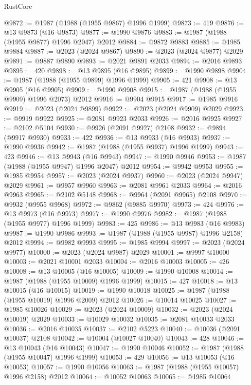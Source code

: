 \begin{lexlean}{RustCore}
\begin{coremodule}
@9872 := @1987 (@1988 (@1955 @9867) @1996 @1999)
@9873 := 419
@9876 := @13 @9873 (@16 @9873)
@9877 := @1990 @9876
@9883 := @1987 (@1988 (@1955 @9877) @1996 @2047) @2012
@9884 := @9872 @9883
@9885 := @1985 @9884
@9887 := @2023 (@2024 @9867)
@9890 := @2023 (@2024 @9877) @2029
@9891 := @9887 @9890
@9893 := @2021 @9891 @2033
@9894 := @2016 @9893
@9895 := 420
@9898 := @13 @9895 (@16 @9895)
@9899 := @1990 @9898
@9904 := @1987 (@1988 (@1955 @9899) @1996 @1999)
@9905 := 421
@9908 := @13 @9905 (@16 @9905)
@9909 := @1990 @9908
@9915 := @1987 (@1988 (@1955 @9909) @1996 @2073) @2012
@9916 := @9904 @9915
@9917 := @1985 @9916
@9919 := @2023 (@2024 @9899)
@9922 := @2023 (@2024 @9909) @2029
@9923 := @9919 @9922
@9925 := @2081 @9923 @2033
@9926 := @2016 @9925
@9927 := @2102 @5104
@9930 := @9926 (@2091 @9927) @2108
@9932 := @9894 (@9917 @9930)
@9933 := 422
@9936 := @13 @9933 (@16 @9933)
@9937 := @1990 @9936
@9942 := @1987 (@1988 (@1955 @9937) @1996 @1999)
@9943 := 423
@9946 := @13 @9943 (@16 @9943)
@9947 := @1990 @9946
@9953 := @1987 (@1988 (@1955 @9947) @1996 @2047) @2012
@9954 := @9942 @9953
@9955 := @1985 @9954
@9957 := @2023 (@2024 @9937)
@9960 := @2023 (@2024 @9947) @2029
@9961 := @9957 @9960
@9963 := @2081 @9961 @2033
@9964 := @2016 @9963
@9965 := @2102 @5148
@9968 := @9964 (@2091 @9965) @2108
@9970 := @9932 (@9955 @9968)
@9972 := @9862 (@9885 @9970)
@9973 := 424
@9976 := @13 @9973 (@16 @9973)
@9977 := @1990 @9976
@9982 := @1987 (@1988 (@1955 @9977) @1996 @1999)
@9983 := 425
@9986 := @13 @9983 (@16 @9983)
@9987 := @1990 @9986
@9993 := @1987 (@1988 (@1955 @9987) @1996 @2158) @2012
@9994 := @9982 @9993
@9995 := @1985 @9994
@9997 := @2023 (@2024 @9977)
@10000 := @2023 (@2024 @9987) @2029
@10001 := @9997 @10000
@10003 := @2021 @10001 @2033
@10004 := @2016 @10003
@10005 := 426
@10008 := @13 @10005 (@16 @10005)
@10009 := @1990 @10008
@10014 := @1987 (@1988 (@1955 @10009) @1996 @1999)
@10015 := 427
@10018 := @13 @10015 (@16 @10015)
@10019 := @1990 @10018
@10025 := @1987 (@1988 (@1955 @10019) @1996 @2009) @2012
@10026 := @10014 @10025
@10027 := @1985 @10026
@10029 := @2023 (@2024 @10009)
@10032 := @2023 (@2024 @10019) @2029
@10033 := @10029 @10032
@10035 := @2081 @10033 @2033
@10036 := @2016 @10035
@10037 := @2102 @5223
@10040 := @10036 (@2091 @10037) @2108
@10042 := @10004 (@10027 @10040)
@10043 := 428
@10046 := @13 @10043 (@16 @10043)
@10047 := @1990 @10046
@10052 := @1987 (@1988 (@1955 @10047) @1996 @1999)
@10053 := 429
@10056 := @13 @10053 (@16 @10053)
@10057 := @1990 @10056
@10063 := @1987 (@1988 (@1955 @10057) @1996 @2158) @2012
@10064 := @10052 @10063
@10065 := @1985 @10064

\end{coremodule}
\end{lexlean}
